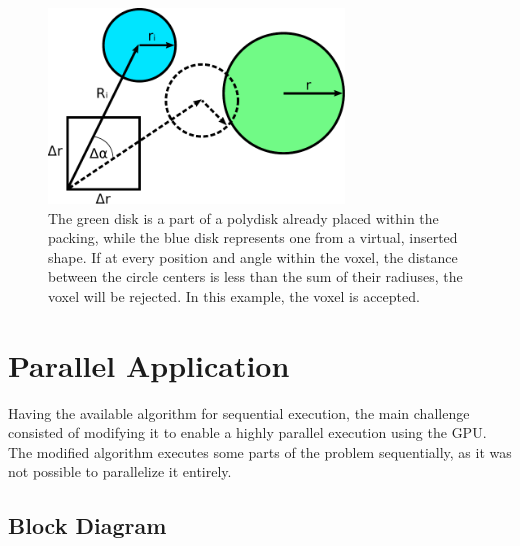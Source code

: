 \documentclass[12pt, oneside]{report}
\begin{document}
\begin{figure}[H]
  \centering
	\label{CieslaAlgorithmDemo}
	\includegraphics[width=0.7\textwidth,keepaspectratio]{Images/CieslaAlgorithm/drawing.pdf}
	\caption{The green disk is a part of a polydisk already placed within the packing, while the blue disk represents one from a virtual, inserted shape. If at every position and angle within the voxel, the distance between the circle centers is less than the sum of their radiuses, the voxel will be rejected. In this example, the voxel is accepted.}
\end{figure}

\section {Parallel Application}

Having the available algorithm for sequential execution, the main challenge consisted of modifying it to enable a highly parallel execution using the GPU. The modified algorithm executes some parts of the problem sequentially, as it was not possible to parallelize it entirely.

\subsection{Block Diagram}
\end{document}
